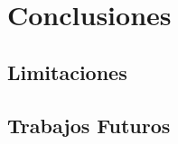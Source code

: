 
\chapter{Conclusiones\label{chap:Conclusiones}}


\section{Limitaciones}


\section{Trabajos Futuros}

%
%

